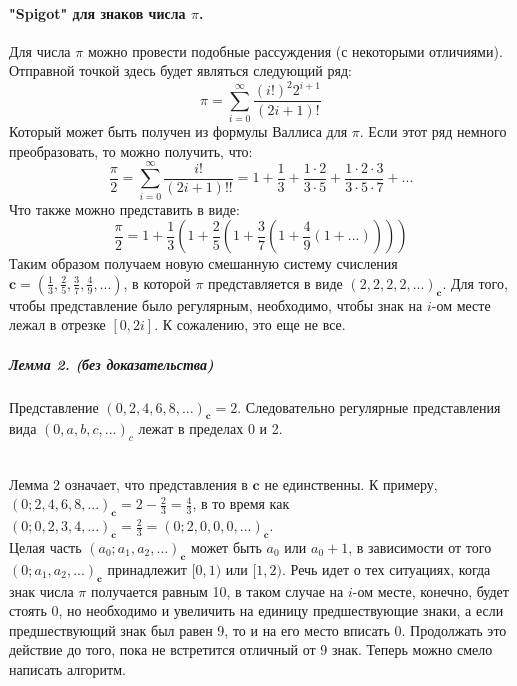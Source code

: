 \documentclass{book}
\begin{document}
\paragraph{"Spigot" для знаков числа $\pi$.}
\begin{normalsize}
Для числа $\pi$ можно провести подобные рассуждения (с некоторыми отличиями). Отправной точкой здесь будет являться следующий ряд:\\
$$\pi = \sum_{i=0}^{\infty} \frac{(i!)^{2}2^{i+1}}{(2i+1)!}$$
Который может быть получен из формулы Валлиса для $\pi$. Если этот ряд немного преобразовать, то можно получить, что:\\
$$\frac{\pi}{2} = \sum_{i=0}^{\infty} \frac{i!}{(2i+1)!!} = 1 + \frac{1}{3} + \frac{1 \cdot 2}{3 \cdot 5} + \frac{1 \cdot 2 \cdot 3}{3 \cdot 5 \cdot 7} + ...$$
Что также можно представить в виде:\\
$$\frac{\pi}{2} = 1 + \frac{1}{3}(1 + \frac{2}{5}(1+\frac{3}{7}(1+\frac{4}{9}(1 + ...))))$$
Таким образом получаем новую смешанную систему счисления $\textbf{c} = (\frac{1}{3}, \frac{2}{5}, \frac{3}{7}, \frac{4}{9}, ...)$, в которой $\pi$ представляется в виде $(2,2,2,2,...)_{\textbf{c}}$. Для того, чтобы представление было регулярным, необходимо, чтобы знак на $i$-ом месте лежал в отрезке $[0,2i]$. К сожалению, это еще не все.
\end{normalsize}
\subparagraph*{Лемма 2. (без доказательства)\\}
\begin{normalsize}
Представление $(0,2,4,6,8,...)_{\textbf{c}} = 2$. Следовательно регулярные представления вида $(0,a,b,c,...)_{c}$ лежат в пределах 0 и 2.\\\\
\end{normalsize}
\begin{normalsize}
Лемма 2 означает, что представления в $\textbf{c}$ не единственны. К примеру, $(0;2,4,6,8,...)_{\textbf{c}} = 2 - \frac{2}{3} = \frac{4}{3}$, в то время как $(0;0,2,3,4,...)_{\textbf{c}} = \frac{2}{3} = (0;2,0,0,0,...)_{\textbf{c}}$.\\
Целая часть $(a_0;a_1,a_2,...)_{\textbf{c}}$ может быть $a_0$ или $a_0+1$, в зависимости от того $(0;a_1,a_2,...)_{\textbf{c}}$ принадлежит $[0,1)$ или $[1,2)$. Речь идет о тех ситуациях, когда знак числа $\pi$ получается равным 10, в таком случае на $i$-ом месте, конечно, будет стоять 0, но необходимо и увеличить на единицу предшествующие знаки, а если предшествующий знак был равен 9, то и на его место вписать 0. Продолжать это действие до того, пока не встретится отличный от 9 знак. Теперь можно смело написать алгоритм.\\
\end{normalsize}
\end{document}
